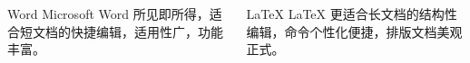 \documentclass{ctexbeamer}
\begin{document}
\begin{frame}
  \begin{columns}[T]
    \begin{column}{.5\textwidth}
      \begin{stampblock}[1]{Word}
        Microsoft\textsuperscript{\circledR{}} Word 所见即所得，适合短文档的快捷编辑，适用性广，功能丰富。
      \end{stampblock}
    \end{column}
    \begin{column}{.5\textwidth}
      \begin{stampblock}[2]{\LaTeX{}}
        \LaTeX{} 更适合长文档的结构性编辑，命令个性化便捷，排版文档美观正式。
      \end{stampblock}
    \end{column}
  \end{columns}
\end{frame}
\end{document}
